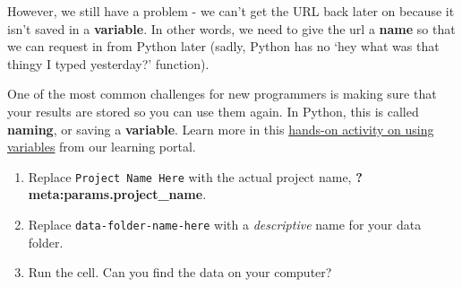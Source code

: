 \documentclass[
  letterpaper,
  DIV=11,
  numbers=noendperiod,
  oneside]{scrreprt}
\providecommand{\tightlist}{%
  \setlength{\itemsep}{0pt}\setlength{\parskip}{0pt}}
\begin{document}
However, we still have a problem - we can't get the URL back later on
because it isn't saved in a \textbf{variable}. In other words, we need
to give the url a \textbf{name} so that we can request in from Python
later (sadly, Python has no `hey what was that thingy I typed
yesterday?' function).

\begin{tcolorbox}[enhanced jigsaw, colbacktitle=quarto-callout-color!10!white, opacityback=0, bottomtitle=1mm, toptitle=1mm, bottomrule=.15mm, left=2mm, colframe=quarto-callout-color-frame, leftrule=.75mm, opacitybacktitle=0.6, colback=white, rightrule=.15mm, toprule=.15mm, breakable, titlerule=0mm, title=\textcolor{quarto-callout-color}{\faInfo}\hspace{0.5em}{Read More: Names/variables in Python}, coltitle=black, arc=.35mm]

One of the most common challenges for new programmers is making sure
that your results are stored so you can use them again. In Python, this
is called \textbf{naming}, or saving a \textbf{variable}. Learn more in
this
\href{https://www.earthdatascience.org/courses/intro-to-earth-data-science/python-code-fundamentals/get-started-using-python/variables/}{hands-on
activity on using variables} from our learning portal.

\end{tcolorbox}

\begin{tcolorbox}[enhanced jigsaw, colbacktitle=quarto-callout-color!10!white, opacityback=0, bottomtitle=1mm, toptitle=1mm, bottomrule=.15mm, left=2mm, colframe=quarto-callout-color-frame, leftrule=.75mm, opacitybacktitle=0.6, colback=white, rightrule=.15mm, toprule=.15mm, breakable, titlerule=0mm, title=\textcolor{quarto-callout-color}{\faInfo}\hspace{0.5em}{Try It: Save the URL for later}, coltitle=black, arc=.35mm]

\begin{enumerate}
\def\labelenumi{\arabic{enumi}.}
\tightlist
\item
  Replace \texttt{Project\ Name\ Here} with the actual project name,
  \textbf{?meta:params.project\_name}.
\item
  Replace \texttt{data-folder-name-here} with a \emph{descriptive} name
  for your data folder.
\item
  Run the cell. Can you find the data on your computer?
\end{enumerate}

\end{tcolorbox}
\end{document}
